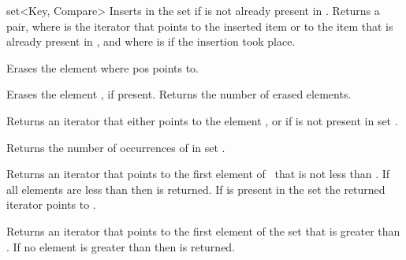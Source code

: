\begin{ccClassTemplate} {set<Key, Compare>}
{Inserts  in the set if  is not already
 present in \ccVar. Returns a pair, where 
 is the iterator that points to the inserted item or to the
 item that is already present in \ccVar, and where 
 is  if the insertion took place.}

{Erases the element where pos points to.}

{Erases the element , if present. Returns the number
 of erased elements.}


{Returns an iterator that either points to the element ,
 or  if  is not present in set \ccVar.}

{Returns the number of occurrences of  in set \ccVar.}


{Returns an iterator that points to the first element of \ccVar\ 
that is not less than . If all elements are less than
 then \ccStyle{end()} is returned. If 
is present in the set the returned iterator points to \ccStyle{k}.}

{Returns an iterator that points to the first element of the set
that is greater than . If no element is greater than
\ccStyle{k} then  is returned.}

\end{ccClassTemplate} 
